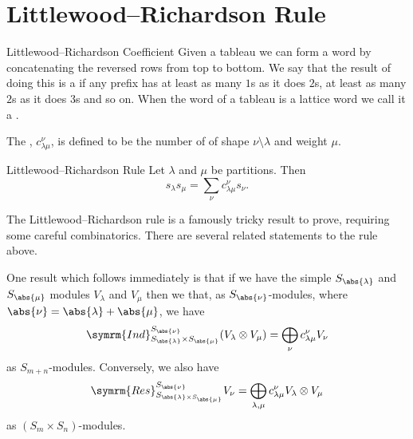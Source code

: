 \documentclass[fleqn]{NotesClass}
\newcommand{\Res}{\symrm{Res}}
\newcommand{\Ind}{\symrm{Ind}}
\begin{document}
    \section{Littlewood--Richardson Rule}
    \begin{dfn}{Littlewood--Richardson Coefficient}{}
        Given a tableau we can form a word by concatenating the reversed rows from top to bottom.
        We say that the result of doing this is a  if any prefix has at least as many \(1\)s as it does \(2\)s, at least as many \(2\)s as it does \(3\)s and so on.
        When the word of a tableau is a lattice word we call it a .
        
        The , \(c_{\lambda\mu}^\nu\), is defined to be the number of of shape \(\nu \setminus \lambda\) and weight \(\mu\).
    \end{dfn}
    
    \begin{thm}{Littlewood--Richardson Rule}{}
        Let \(\lambda\) and \(\mu\) be partitions.
        Then
        \begin{equation}
            s_\lambda s_\mu = \sum_{\nu} c^\nu_{\lambda\mu} s_\nu.
        \end{equation}
    \end{thm}
    
    The Littlewood--Richardson rule is a famously tricky result to prove, requiring some careful combinatorics.
    There are several related statements to the rule above.
    
    One result which follows immediately is that if we have the simple \(S_{\abs{\lambda}}\) and \(S_{\abs{\mu}}\) modules \(V_\lambda\) and \(V_\mu\) then we that, as \(S_{\abs{\nu}}\)-modules, where \(\abs{\nu} = \abs{\lambda} + \abs{\mu}\), we have
    \begin{equation}
        \Ind^{S_{\abs{\nu}}}_{S_{\abs{\lambda}} \times S_{\abs{\mu}}} (V_\lambda \otimes V_\mu) = \bigoplus_{\nu} c^\nu_{\lambda\mu} V_\nu
    \end{equation}
    as \(S_{m + n}\)-modules.
    Conversely, we also have
    \begin{equation}
        \Res^{S_{\abs{\nu}}}_{S_{\abs{\lambda} \times S_{\abs{\mu}}}} V_\nu = \bigoplus_{\lambda,\mu} c^\nu_{\lambda\mu} V_\lambda \otimes V_\mu
    \end{equation}
    as \((S_m \times S_n)\)-modules.
    
\end{document}
